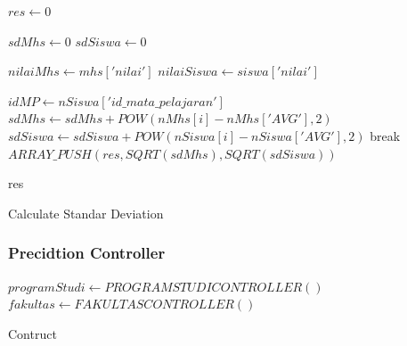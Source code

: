 \begin{algorithm}[H]
  \begin{algorithmic}[1]
        \State $res \gets 0$
        
        \State $sdMhs \gets 0$
        \State $sdSiswa \gets 0$
        
        \State $nilaiMhs \gets mhs['nilai']$
        \State $nilaiSiswa \gets siswa['nilai']$
        
            \State $idMP \gets nSiswa['id\_mata\_pelajaran']$
                        \State $sdMhs \gets sdMhs + POW(nMhs[i]-nMhs['AVG'],2)$
                        \State $sdSiswa \gets sdSiswa + POW(nSiswa[i]-nSiswa['AVG'],2)$
                    \EndFor
                    \State break
                \EndIf
            \EndFor
        \EndFor
        \State $ARRAY\_PUSH(res, SQRT(sdMhs), SQRT(sdSiswa))$
        
        \State \Return res
    \EndProcedure
  \end{algorithmic} 
  \caption{Calculate Standar Deviation}
  \label{alg:calculateStandarDeviation pearson}
\end{algorithm}

\subsubsection{Precidtion Controller}
\label{subsec:prediction}

\begin{algorithm}[H]
  \begin{algorithmic}[1]
        \State $programStudi \gets PROGRAMSTUDICONTROLLER()$
        \State $fakultas \gets FAKULTASCONTROLLER()$
    \EndProcedure
  \end{algorithmic} 
  \caption{Contruct}
  \label{alg:Contruct prediction}
\end{algorithm}

